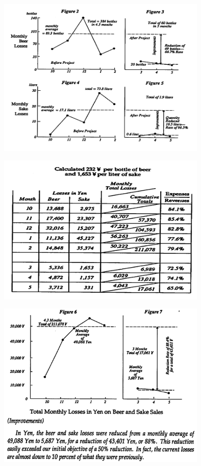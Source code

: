 
\includegraphics[width=10cm]{club20.png}


\includegraphics[width=10cm]{club21.png}


\includegraphics[width=10cm]{club22.png}


